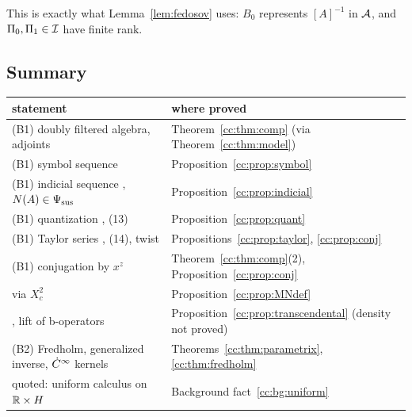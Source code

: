 This is exactly what Lemma~\ref{lem:fedosov} uses: \(B_0\) represents
\([A]^{-1}\) in \(\mathcal A\), and \(\Pi_0,\Pi_1\in\mathcal I\) have finite rank.

\subsection{Summary}\label{cc:subsec:summary}
\begin{center}
\renewcommand{\arraystretch}{1.2}
\begin{tabular}{p{}p{}}
 statement & where proved\\\hline
 (B1) doubly filtered algebra, adjoints &
 Theorem~\ref{cc:thm:comp} (via Theorem~\ref{cc:thm:model})\\
 (B1) symbol sequence \cite[(11)]{MN} & Proposition~\ref{cc:prop:symbol}\\
 (B1) indicial sequence \cite[(12)]{MN}, \(N(A)\in\Psi_{\mathrm{sus}}\) &
 Proposition~\ref{cc:prop:indicial}\\
 (B1) quantization \cite[Prop.~24]{MN}, (13) &
 Proposition~\ref{cc:prop:quant}\\
 (B1) Taylor series \cite[Prop.~25]{MN}, (14), twist &
 Propositions~\ref{cc:prop:taylor}, \ref{cc:prop:conj}\\
 (B1) conjugation by \(x^z\) & Theorem~\ref{cc:thm:comp}(2),
 Proposition~\ref{cc:prop:conj}\\
 \cite[Def.~2]{MN} via \(X_c^2\) & Proposition~\ref{cc:prop:MNdef}\\
 \cite[Prop.~26]{MN}, lift of b-operators &
 Proposition~\ref{cc:prop:transcendental} (density not proved)\\
 (B2) Fredholm, generalized inverse, \(\dot C^\infty\) kernels &
 Theorems~\ref{cc:thm:parametrix}, \ref{cc:thm:fredholm}\\
 quoted: uniform calculus on \(\mathbb R\times H\) &
 Background fact~\ref{cc:bg:uniform}\\
\end{tabular}
\end{center}
